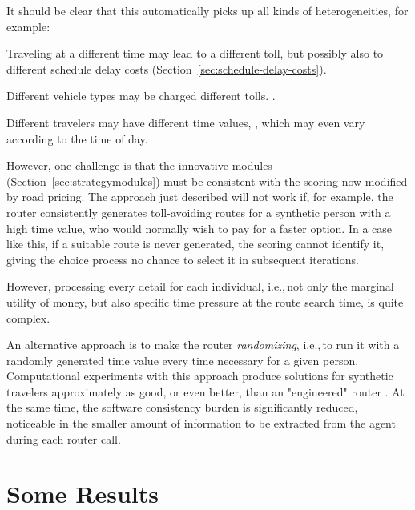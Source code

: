 It should be clear that this automatically picks up all kinds of heterogeneities, for example:
\begin{compactitem}
\item Traveling at a different time may lead to a different toll, but possibly also to different schedule delay costs (Section~\ref{sec:schedule-delay-costs}). 
\item Different vehicle types may be charged different tolls. \citep{KickhoeferNagel2012EmissionInternalization}.
\item Different travelers may have different time values, \citep{NagelKickhoeferJoubert2014HeterogeneousVoTsPROCEDIA}, which may even vary according to the time of day.
\end{compactitem}

However, one challenge is that the innovative modules (Section~\ref{sec:strategymodules}) must be consistent with the scoring now modified by road pricing. The approach just described will not work if, for example, the router consistently generates toll-avoiding routes for a synthetic person with a high time value,  who would normally wish to pay for a faster option. In a case like this, if a suitable route is never generated, the scoring cannot identify it, giving  the choice process no chance to select it in subsequent iterations.

However, processing every detail for each individual, i.e.,\,not only the marginal utility of money, but also specific time pressure at the route search time, is quite complex.

An alternative approach is to make the router \emph{randomizing}, i.e.,\,to run it with a randomly generated time value every time necessary for a given person. Computational experiments with this approach produce solutions for synthetic travelers approximately as good, or even better, than an "engineered" router \citep{NagelKickhoeferJoubert2014HeterogeneousVoTsPROCEDIA}. At the same time, the software consistency burden is significantly reduced, noticeable in the smaller amount of information to be extracted from the agent during each router call.

\section{Some Results}
